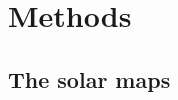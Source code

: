\documentclass{aa}
\begin{document}
\section{Methods}\label{sect:methods}

\subsection{The solar maps}\label{sect:source}
\end{document}
